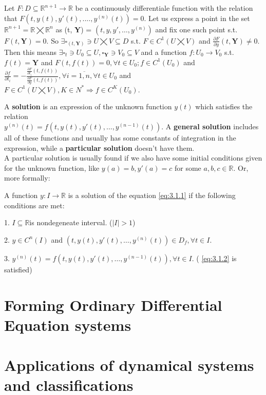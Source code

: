 \begin{theorem}
    Let $F:D \subseteq \mathbb{R}^{n+1}\rightarrow\mathbb{R}$ be a continuously differentiale function with the relation that $F(t,y(t),y'(t),....,y^{(n)}(t))=0$. Let us express a point in the set $\mathbb{R}^{n+1} =\mathbb{R}\bigtimes\mathbb{R}^n$ as (t, \textbf{Y}) = $(t, y,y', \dots, y^{ (n) })$ and fix one such point s.t. $F(t, \textbf{Y})=0$.
    So $\exists \square_{(t, \textbf{Y})} \ni U \bigtimes V \subseteq D$ s.t. $F \in C^1(U\bigtimes V)$ and $\frac{\partial F}{\partial y}(t, \textbf{Y}) \neq 0.$ Then this means $ \exists \square_{t} \ni U_0 \subseteq U,
        \square_{\textbf{Y}} \ni V_0 \subseteq V$ and a function $f : U_0 \rightarrow V_0$ s.t. $f(t) = \textbf{Y}$ and $F(t,f(t))=0, \forall t \in U_0; f \in C^1(U_0)$ and $\frac{\partial f}{\partial t_i} = - \frac{\frac{\partial F}{\partial t_i}(t,f(t))}{\frac{\partial F}{\partial y}(t,f(t))}, \forall i = \overline{1,n} , \forall t \in U_0$ and $F \in C^1(U \bigtimes V),K \in N^* \Rightarrow f \in C^K(U_0).$
\end{theorem}

A \textbf{solution} is an expression of the unknown function $y(t)$ which satisfies the relation \\
$y^{(n)}(t) = f(t,y(t),y'(t),\dots,y^{(n-1)}(t))$. A \textbf{general solution} includes all of these functions and usually has some constants of integration in the expression, while a \textbf{particular solution} doesn't have them. \\
A particular solution is usually found if we also have some initial conditions given for the unknown function, like $y(a)=b, y'(a)=c$ for some $a,b,c  \in \mathbb{R}$.
Or, more formally:

\begin{definition}
    A function $y:I \rightarrow \mathbb{R}$ is a solution of the equation \ref{eq:3.1.1} if the following conditions are met:

    1. $I \subseteq \mathbb{R}$is nondegeneate interval. ($|I|>1$)

    2. $y \in C^n(I)$ and $(t,y(t), y'(t), \dots, y^{(n)}(t)) \in D_f, \forall t \in I$.

    3. $y^{(n)}(t)= f(t,y(t),y'(t),\dots,y^(n-1)(t)), \forall t \in I$. ( \ref{eq:3.1.2} is satisfied)

\end{definition}


\section{Forming Ordinary Differential Equation systems}


\section{Applications of dynamical systems and classifications}
